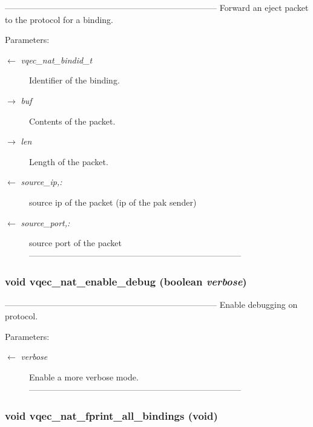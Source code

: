 --------------------------------------------------------------------------- Forward an eject packet to the protocol for a binding.

\begin{Desc}
\item[Parameters:]
\begin{description}
\item[\mbox{$\leftarrow$} {\em vqec\_\-nat\_\-bindid\_\-t}]Identifier of the binding. \item[\mbox{$\rightarrow$} {\em buf}]Contents of the packet. \item[\mbox{$\rightarrow$} {\em len}]Length of the packet. \item[\mbox{$\leftarrow$} {\em source\_\-ip,:}]source ip of the packet (ip of the pak sender) \item[\mbox{$\leftarrow$} {\em source\_\-port,:}]source port of the packet --------------------------------------------------------------------------- \end{description}
\end{Desc}
\subsubsection{\setlength{\rightskip}{0pt plus 5cm}void vqec\_\-nat\_\-enable\_\-debug (boolean {\em verbose})}\label{vqec__nat__interface_8h_3ff22996ca5865f197472e49376ff6fc}


--------------------------------------------------------------------------- Enable debugging on protocol.

\begin{Desc}
\item[Parameters:]
\begin{description}
\item[\mbox{$\leftarrow$} {\em verbose}]Enable a more verbose mode. --------------------------------------------------------------------------- \end{description}
\end{Desc}
\subsubsection{\setlength{\rightskip}{0pt plus 5cm}void vqec\_\-nat\_\-fprint\_\-all\_\-bindings (void)}\label{vqec__nat__interface_8h_2d793836b5a6eb9960fd6a319a9865ad}


